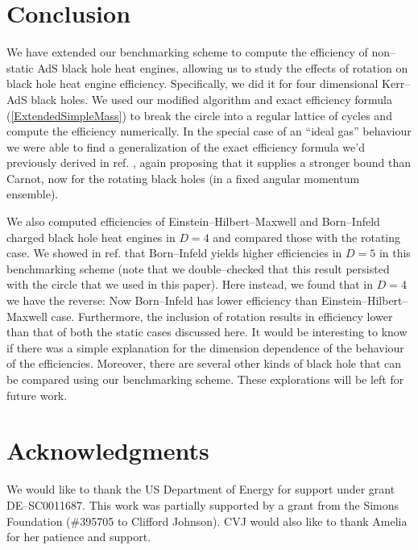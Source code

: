 \documentclass[letterpaper,11pt]{article}
\begin{document}
\section{Conclusion}
\label{Conc}

We have extended our  benchmarking scheme \cite{Chakraborty:2016ssb} to compute the efficiency of non--static AdS black hole heat engines, allowing us to study the effects of rotation on black hole heat engine efficiency. Specifically, we did it for four dimensional Kerr--AdS black holes. We used our modified algorithm and exact efficiency formula (\ref{ExtendedSimpleMass}) to break the circle into a regular lattice of cycles and compute the efficiency numerically. In the special case of an ``ideal gas'' behaviour we were able to find a generalization of the exact efficiency formula we'd previously derived in ref. \cite{Chakraborty:2016ssb}, again proposing that it supplies a stronger bound than Carnot, now for the rotating black holes (in a fixed angular momentum ensemble).  

We also computed efficiencies of Einstein--Hilbert--Maxwell and Born--Infeld charged black hole heat engines in $D=4$ and compared those with the rotating case. We  showed in ref. \cite{Chakraborty:2016ssb} that Born--Infeld yields higher efficiencies in $D=5$ in this benchmarking scheme (note that we double--checked that this result persisted with the circle that we used in this paper).  Here instead,  we found that in $D=4$ we have the reverse: Now Born--Infeld has lower efficiency than Einstein--Hilbert--Maxwell case. Furthermore,  the  inclusion of rotation results in efficiency lower than that of both the static cases discussed here. It would be interesting to know if there was a simple explanation for the dimension dependence of the behaviour of the efficiencies. Moreover, there are several other kinds of black hole that can be compared using our benchmarking scheme. These explorations will be left for future work.

\section*{Acknowledgments}

We would like to thank   the  US Department of Energy for support under grant DE--SC0011687. This work was partially supported by a grant from the Simons Foundation (\#395705 to Clifford Johnson). CVJ  would also like to thank Amelia for her patience and support.
\end{document}
